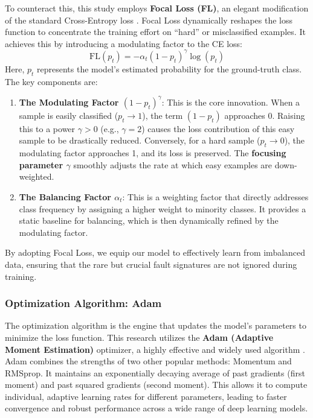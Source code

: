 To counteract this, this study employs \textbf{Focal Loss (FL)}, an elegant modification of the standard Cross-Entropy loss \citep{lin2017focal}. Focal Loss dynamically reshapes the loss function to concentrate the training effort on ``hard'' or misclassified examples. It achieves this by introducing a modulating factor to the CE loss:
\begin{equation}
\text{FL}(p_t) = - \alpha_t (1 - p_t)^\gamma \log(p_t)
\label{eq:focal_loss}
\end{equation}
Here, $p_t$ represents the model's estimated probability for the ground-truth class. The key components are:
\begin{enumerate}
    \item \textbf{The Modulating Factor $(1 - p_t)^\gamma$}: This is the core innovation. When a sample is easily classified ($p_t \to 1$), the term $(1 - p_t)$ approaches 0. Raising this to a power $\gamma > 0$ (e.g., $\gamma = 2$) causes the loss contribution of this easy sample to be drastically reduced. Conversely, for a hard sample ($p_t \to 0$), the modulating factor approaches 1, and its loss is preserved. The \textbf{focusing parameter $\gamma$} smoothly adjusts the rate at which easy examples are down-weighted.
    \item \textbf{The Balancing Factor $\alpha_t$}: This is a weighting factor that directly addresses class frequency by assigning a higher weight to minority classes. It provides a static baseline for balancing, which is then dynamically refined by the modulating factor.
\end{enumerate}
By adopting Focal Loss, we equip our model to effectively learn from imbalanced data, ensuring that the rare but crucial fault signatures are not ignored during training.

\subsubsection{Optimization Algorithm: Adam}
\label{sec:optimizer_adam}

The optimization algorithm is the engine that updates the model's parameters to minimize the loss function. This research utilizes the \textbf{Adam (Adaptive Moment Estimation)} optimizer, a highly effective and widely used algorithm \citep{kingma2014adam}. Adam combines the strengths of two other popular methods: Momentum and RMSprop. It maintains an exponentially decaying average of past gradients (first moment) and past squared gradients (second moment). This allows it to compute individual, adaptive learning rates for different parameters, leading to faster convergence and robust performance across a wide range of deep learning models.

